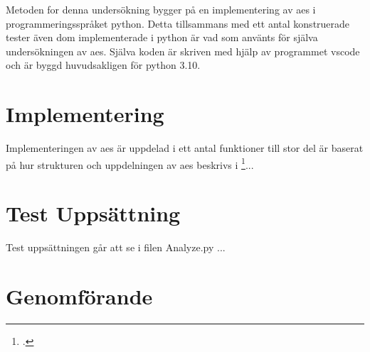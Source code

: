 Metoden for denna undersökning bygger på en implementering av \acrshort{aes} i programmeringsspråket
\gls{python}. Detta tillsammans med ett antal konstruerade tester även dom implementerade i
\gls{python} är vad som använts för själva undersökningen av \acrshort{aes}. Själva koden
är skriven med hjälp av programmet \gls{vscode} och är byggd huvudsakligen för \gls{python} 3.10.

\section{Implementering}
Implementeringen av \acrshort{aes} är uppdelad i ett antal funktioner till stor del är baserat på
hur strukturen och uppdelningen av \acrshort{aes} beskrivs i \footcite{daemen1999aes}...

\section{Test Uppsättning}
Test uppsättningen går att se i filen Analyze.py ...

\section{Genomförande}
